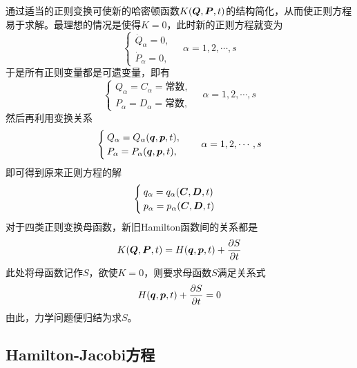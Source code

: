 通过适当的正则变换可使新的哈密顿函数$K(\boldsymbol{Q},\boldsymbol{P},t)$的结构简化，从而使正则方程易于求解。最理想的情况是使得$K = 0$，此时新的正则方程就变为
\begin{equation*}
	\begin{cases}
		\dot{Q}_\alpha = 0, \\
		\dot{P}_\alpha = 0,
	\end{cases}\quad \alpha = 1,2,\cdots,s
\end{equation*}
于是所有正则变量都是可遗变量，即有
\begin{equation*}
	\begin{cases}
		Q_\alpha = C_\alpha = \text{常数}, \\
		P_\alpha = D_\alpha = \text{常数},
	\end{cases}\quad \alpha=1,2,\cdots,s
\end{equation*}
然后再利用变换关系
\begin{equation*}
	\begin{cases}
		Q_\alpha = Q_\alpha(\boldsymbol{q},\boldsymbol{p},t), \\
		P_\alpha = P_\alpha(\boldsymbol{q},\boldsymbol{p},t),
	\end{cases}\quad \alpha = 1,2,\cdots,s
\end{equation*}
即可得到原来正则方程的解
\begin{equation*}
	\begin{cases}
		q_\alpha = q_\alpha(\boldsymbol{C},\boldsymbol{D},t) \\
		p_\alpha = p_\alpha(\boldsymbol{C},\boldsymbol{D},t)
	\end{cases}
\end{equation*}
对于四类正则变换母函数，新旧Hamilton函数间的关系都是
\begin{equation*}
	K(\boldsymbol{Q},\boldsymbol{P},t) = H(\boldsymbol{q},\boldsymbol{p},t) + \frac{\partial S}{\partial t}
\end{equation*}
此处将母函数记作$S$，欲使$K = 0$，则要求母函数$S$满足关系式
\begin{equation}
	H(\boldsymbol{q},\boldsymbol{p},t) + \frac{\partial S}{\partial t} = 0
\end{equation}
由此，力学问题便归结为求$S$。

\subsection{Hamilton-Jacobi方程}

